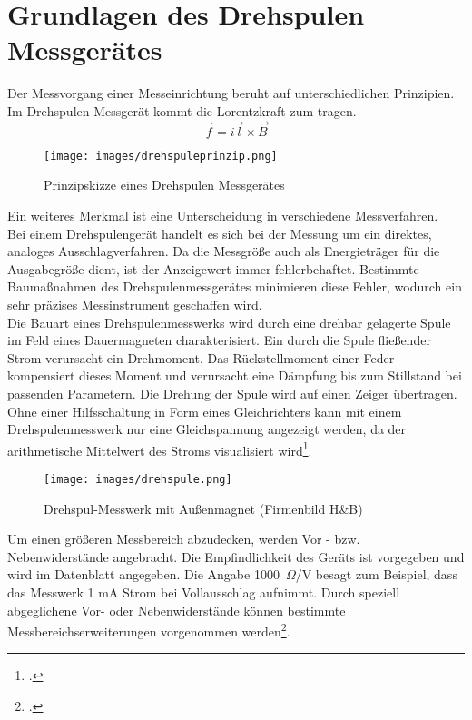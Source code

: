 \documentclass[12pt,a4paper]{scrartcl}	%
\begin{document}
\section{Grundlagen des Drehspulen Messgerätes}\label{grundlagen}
Der Messvorgang einer Messeinrichtung beruht auf unterschiedlichen Prinzipien. Im Drehspulen Messgerät kommt die Lorentzkraft zum tragen.
\[ \vec{f} = i\vec{l}\times \vec{B}  \]
\begin{figure}[htb]
	\centering
	\texttt{[image: images/drehspuleprinzip.png]}
	\caption{Prinzipskizze eines Drehspulen Messgerätes}
\end{figure}
Ein weiteres Merkmal ist eine Unterscheidung in verschiedene Messverfahren.\\
Bei einem Drehspulengerät handelt es sich bei der Messung um ein direktes, analoges Ausschlagverfahren. Da die Messgröße auch als Energieträger für die Ausgabegröße dient, ist der Anzeigewert immer fehlerbehaftet.
Bestimmte Baumaßnahmen des Drehspulenmessgerätes minimieren diese Fehler, wodurch ein sehr präzises Messinstrument geschaffen wird.\\
Die Bauart eines Drehspulenmesswerks wird durch eine drehbar gelagerte Spule im Feld eines Dauermagneten charakterisiert. Ein durch die Spule fließender Strom verursacht ein Drehmoment. Das Rückstellmoment einer Feder kompensiert dieses Moment und verursacht eine Dämpfung bis zum Stillstand bei passenden Parametern. Die Drehung der Spule wird auf einen Zeiger übertragen. Ohne einer Hilfsschaltung in Form eines Gleichrichters kann mit einem Drehspulenmesswerk nur eine Gleichspannung angezeigt werden, da der arithmetische Mittelwert des Stroms visualisiert wird\footcite[vgl.][S. 223]{elek}.
\begin{figure}[htb]
	\centering
	\texttt{[image: images/drehspule.png]}
	\caption{Drehspul-Messwerk mit Außenmagnet (Firmenbild H\&B)}
\end{figure}
Um einen größeren Messbereich abzudecken, werden Vor - bzw. Nebenwiderstände angebracht. Die Empfindlichkeit des Geräts ist vorgegeben und wird im Datenblatt angegeben. Die Angabe 1000~$\Omega$/V besagt zum Beispiel, dass das Messwerk 1 mA Strom bei Vollausschlag aufnimmt. Durch speziell abgeglichene Vor- oder Nebenwiderstände können bestimmte Messbereichserweiterungen vorgenommen werden\footcite[vgl.][Abruf am 15.0.2018]{dreh}.
\end{document}
